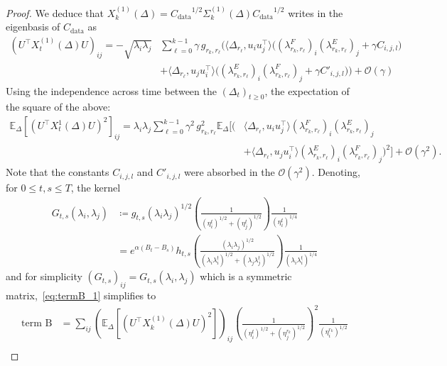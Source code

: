 \documentclass[11pt]{article}
\newcommand{\eqdef}{\coloneqq}
\newcommand{\EE}{\mathbb{E}}
\begin{document}
\begin{proof}
We deduce that $ X^{(1)}_k (\Delta) = {C_\mathrm{data}}^{1/2}\Sigma^{(1)}_k (\Delta) {C_\mathrm{data}}^{1/2}$ writes in the eigenbasis of $C_\mathrm{data}$ as 
\begin{equation*}
\begin{split}
 (U^\top X_{t}^{(1)}(\Delta) U)_{ij} = -  \sqrt{\lambda_i \lambda_j}  &\sum_{\ell=0}^{k-1} \gamma \,  g_{r_k,r_\ell} \Biggl( \langle \Delta_{r_\ell}, u_i u_j^\top \rangle \biggl( (\lambda^F_{r_k,r_\ell})_i (\lambda^E_{r_k,r_\ell})_j + \gamma C_{i,j, l} \biggr) \\
 &+ \langle \Delta_{r_\ell}, u_j u_i^\top \rangle \biggl( (\lambda^E_{r_k,r_\ell})_i  (\lambda^F_{r_k,r_\ell})_j + \gamma C'_{i,j,l} \biggr) \Biggr)   + \mathcal{O}(\gamma)
\end{split}
\end{equation*}
Using the independence across time between the $(\Delta_t)_{t \geq 0}$, the expectation of the square of the above:
\begin{equation*}
\begin{split}
\EE_\Delta[ (U^\top X_{t}^1(\Delta) U)^2]_{ij}
 = \lambda_i \lambda_j  \sum_{\ell=0}^{k-1} \gamma^2 \,  g_{r_k,r_\ell}^2 \EE_\Delta\biggl[\biggl( &\langle \Delta_{r_\ell}, u_i u_j^\top \rangle (\lambda^F_{r_k,r_\ell})_i (\lambda^E_{r_k,r_\ell})_j \\
 &+ \langle \Delta_{r_\ell}, u_j u_i^\top \rangle (\lambda^E_{r_k,r_\ell})_i (\lambda^F_{r_k,r_\ell})_j \biggr)^2\biggr] + \mathcal{O}(\gamma^2) .
\end{split}
\end{equation*}
Note that the constants $C_{i,j,l}$ and $C'_{i,j,l}$ were absorbed in the $\mathcal{O}(\gamma^2)$.
Denoting, for $0 \leq t,s \leq T$, the kernel
\begin{align} \label{eq:Gts}
    G_{t,s}(\lambda_i, \lambda_j) &\eqdef g_{t,s} (\lambda_i \lambda_j)^{1/2} \left(\frac{1}{ (\eta^t_i)^{1/2} + (\eta^t_j)^{1/2} }\right)  \frac{1}{(\eta^t_i)^{1/4}}  \\
    &= e^{\alpha(B_t-B_s)}h_{t,s}  \left(\frac{(\lambda_i \lambda_j)^{1/2}}{ (\lambda_i \lambda^t_i)^{1/2} + (\lambda_j \lambda^t_j)^{1/2} }\right)  \frac{1}{(\lambda_i \lambda^t_i)^{1/4}}
\end{align}
and for simplicity $(G_{t,s})_{ij} =  G_{t,s}(\lambda_i, \lambda_j)$
which is a symmetric matrix,~\eqref{eq:termB_1} simplifies to
\begin{align*}
\text{term B} &=  \sum_{ij} \left(\EE_{\Delta}\left[(U^\top X^{(1)}_k(\Delta) U)^2 \right]\right)_{ij} \left(\frac{1}{ (\eta^t_i)^{1/2} + (\eta^{r_k}_j)^{1/2} }\right)^2 \frac{1}{(\eta^{r_k}_i)^{1/2}} \\

\end{align*}
\end{proof}
\end{document}
